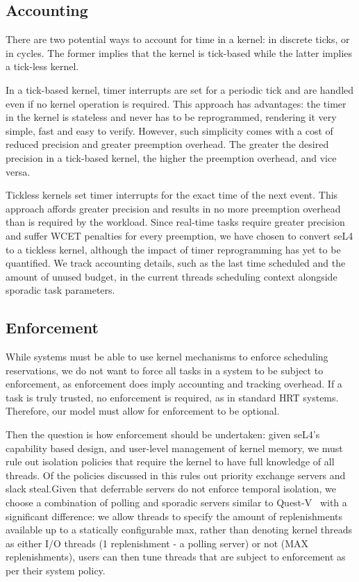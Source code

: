 
\subsection{Accounting}
\label{sec:tick-v-tickless}

There are two potential ways to account for time in a kernel: in discrete ticks, or in cycles.
The former implies that the kernel is tick-based while the latter implies a tick-less kernel.

In a tick-based kernel, timer interrupts are set for a periodic tick and are handled even if no kernel operation is required.
This approach has advantages: the timer in the kernel is stateless and never has to be reprogrammed, rendering it very simple, fast and easy to verify.
However, such simplicity comes with a cost of reduced precision and greater preemption overhead.
The greater the desired precision in a tick-based kernel, the higher the preemption overhead, and vice versa.

Tickless kernels set timer interrupts for the exact time of the next event.
This approach affords greater precision and results in no more preemption overhead than is required by the workload.
Since real-time tasks require greater precision and suffer \gls{WCET} penalties for every preemption, we have chosen to convert seL4 to a tickless kernel, although the impact of timer reprogramming has yet to be quantified.
We track accounting details, such as the last time scheduled and the amount of unused budget, in the current threads scheduling context alongside sporadic task parameters.


\subsection{Enforcement}

While systems must be able to use kernel mechanisms to enforce scheduling reservations, we do not want to force
all tasks in a system to be subject to enforcement, as enforcement does imply accounting and tracking overhead.
If a task is truly trusted, no enforcement is required, as in standard \gls{HRT} systems.
Therefore, our model must allow for enforcement to be optional.

Then the question is how enforcement should be undertaken: given seL4's capability based design, and user-level management of kernel memory, we must rule out isolation policies that require the kernel to have full knowledge of all threads.
Of the policies discussed in  this rules out priority exchange servers and slack steal.Given that deferrable servers do not enforce temporal isolation, we choose a combination of polling and sporadic servers similar to Quest-V~\citep{Danish_LW_11} with a significant difference: we allow threads to specify the amount of replenishments available up to a statically configurable max, rather than denoting kernel threads as either I/O threads (1 replenishment - a polling server) or not (MAX replenishments), users can then tune threads that are subject to enforcement as per their system policy.

